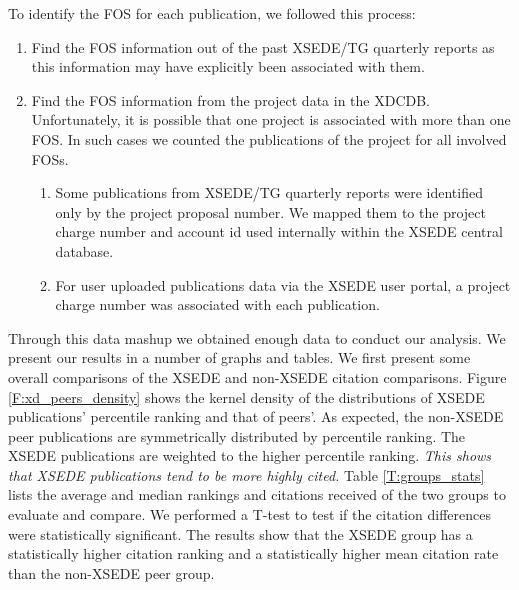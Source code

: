 \documentclass[10pt, conference, compsocconf]{IEEEtran}
\begin{document}
To identify the FOS for each publication, we followed this process:

\begin{enumerate}

\item Find the FOS information out of the past XSEDE/TG quarterly reports as this information may have explicitly been associated with them.

\item Find the FOS information from the project data in the XDCDB. Unfortunately, it is possible that one project is associated with more than one FOS. In such cases we counted the publications of the project for all involved FOSs.

\begin{enumerate}

\item Some publications from XSEDE/TG quarterly reports were identified only by the project proposal number. We mapped them to the project charge number and account id used internally within the XSEDE central database.

\item For user uploaded publications data via the XSEDE user portal, a project charge number was associated with each publication.

\end{enumerate}

\end{enumerate}

Through this data mashup we obtained enough data to conduct our analysis.
We present our results in a number of graphs and tables. We first present some overall comparisons of the XSEDE and non-XSEDE citation comparisons. Figure \ref{F:xd_peers_density} shows the kernel density of the distributions of XSEDE publications' percentile ranking and that of peers'.  As expected, the non-XSEDE peer publications are symmetrically distributed by percentile ranking.  The XSEDE publications are weighted to the higher percentile ranking. {\em This shows that XSEDE publications tend to be more highly cited.} Table \ref{T:groups_stats} lists the average and median rankings and citations received of the two groups to evaluate and compare. We performed a T-test to test if the citation differences were statistically significant. The results show that the XSEDE group has a statistically higher citation ranking and a statistically higher  mean citation rate than the non-XSEDE peer group.
\end{document}
